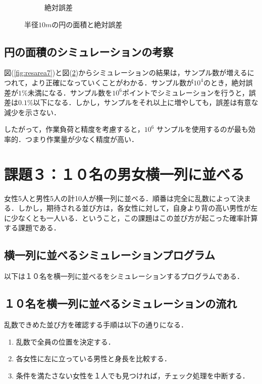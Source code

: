 \documentclass[a4j, titlepage]{jarticle}
\begin{document}
\begin{figure}[htb]
\begin{subfigure}[b]{0.38\textwidth}
            \caption{絶対誤差}
            \label{fig:errarea10}
          \end{subfigure}
          \hfill
              \caption{半径$10m$の円の面積と絶対誤差}
              \label{fig:resarea10}
        \end{figure}
      
      \subsection{円の面積のシミュレーションの考察}
        図(\ref{fig:resarea7})と図(\ref{fig:resarea10})からシミュレーションの結果は，サンプル数が増えるにつれて，より正確になっていくことがわかる．サンプル数が$10^4$のとき，絶対誤差が$1\%$未満になる．サンプル数を$10^6$ポイントでシミュレーションを行うと，誤差は$0.1\%$以下になる．しかし，サンプルをそれ以上に増やしても，誤差は有意な減少を示さない．

        したがって，作業負荷と精度を考慮すると，$10^6$ サンプルを使用するのが最も効率的．つまり作業量が少なく精度が高い．

  \section{課題３：１０名の男女横一列に並べる}
    女性5人と男性5人の計10人が横一列に並べる．順番は完全に乱数によって決まる．しかし，期待される並び方は，各女性に対して，自身より背の高い男性が左に少なくとも一人いる．ということ，この課題はこの並び方が起こった確率計算する課題である．
    
    \subsection{横一列に並べるシミュレーションプログラム}
      以下は１０名を横一列に並べるをシミュレーションするプログラムである．
       

    
    
    \subsection{１０名を横一列に並べるシミュレーションの流れ}
      乱数できめた並び方を確認する手順は以下の通りになる．
      \begin{screen}
        \begin{enumerate}
          \item 乱数で全員の位置を決定する．
          \item 各女性に左に立っている男性と身長を比較する．
          \item 条件を満たさない女性を１人でも見つければ，チェック処理を中断する．
        \end{enumerate}
      \end{screen}
    
\end{document}
